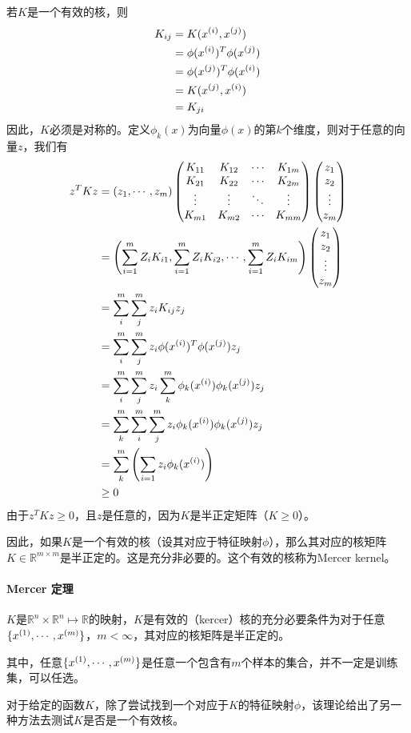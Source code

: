 若$K$是一个有效的核，则
\begin{eqnarray}
\begin{aligned}
K_{ij} &= K({x}^{({i})},{x}^{({j})})\\
&= \phi({x}^{({i})})^T\phi({x}^{({j})})\\
&= \phi({x}^{({j})})^T\phi({x}^{({i})})\\
&= K({x}^{({j})},{x}^{({i})})\\
&= K_{ji}
\end{aligned}
\end{eqnarray}
因此，$K$必须是对称的。定义$\phi_k(x)$为向量$\phi(x)$的第$k$个维度，则对于任意的向量$z$，我们有
\begin{eqnarray}
\begin{aligned}
z^TKz&=\left( {z}_{1},\cdots,{z}_{m} \right)\begin{pmatrix} {K}_{11} & {K}_{12} & \cdots & {K}_{1{m}}\\ {K}_{21} & {K}_{22} & \cdots & {K}_{2{m}}\\ \vdots & \vdots & \ddots & \vdots \\ {K}_{{m}1} & {K}_{{m}2} & \cdots & {K}_{{m}{m}} \end{pmatrix}\begin{pmatrix} {z}_1\\ {z}_2\\ \vdots\\ {z}_{m} \end{pmatrix}\\
&= \left(\sum_{i=1}^mZ_iK_{i1},\sum_{i=1}^mZ_iK_{i2},\cdots,\sum_{i=1}^mZ_iK_{im}\right)\begin{pmatrix} {z}_1\\ {z}_2\\ \vdots\\ {z}_{m} \end{pmatrix}\\
&= \sum_i^m\sum_j^mz_iK_{ij}z_j\\
&= \sum_i^m\sum_j^mz_i\phi({x}^{({i})})^T\phi({x}^{({j})})z_j\\
&= \sum_i^m\sum_j^mz_i\sum_k^m\phi_k({x}^{({i})})\phi_k({x}^{({j})})z_j\\
&= \sum_k^m\sum_i^m\sum_j^mz_i\phi_k({x}^{({i})})\phi_k({x}^{({j})})z_j\\
&= \sum_k^m\left(\sum_{i=1}z_i\phi_k({x}^{({i})})\right)\\
&\geq 0
\end{aligned}
\end{eqnarray}
由于$z^TKz\geq 0$，且$z$是任意的，因为$K$是半正定矩阵（$K\geq 0$）。

因此，如果$K$是一个有效的核（设其对应于特征映射$\phi$），那么其对应的核矩阵$K\in \mathbb{R}^{m\times m}$是半正定的。这是充分非必要的。这个有效的核称为Mercer kernel。

\paragraph{Mercer 定理} $K$是$\mathbb{R}^n\times\mathbb{R}^n\mapsto\mathbb{R}$的映射，$K$是有效的（kercer）核的充分必要条件为对于任意$\{{x}^{({1})},\cdots,{x}^{({m})}\}$，$m<\infty$，其对应的核矩阵是半正定的。

其中，任意$\{{x}^{({1})},\cdots,{x}^{({m})}\}$是任意一个包含有$m$个样本的集合，并不一定是训练集，可以任选。

对于给定的函数$K$，除了尝试找到一个对应于$K$的特征映射$\phi$，该理论给出了另一种方法去测试$K$是否是一个有效核。


